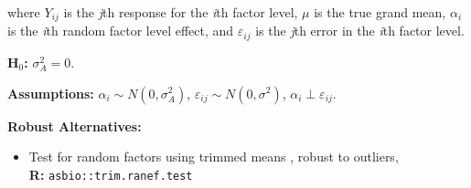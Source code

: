 \documentclass[12pt,english]{article}\usepackage[]{graphicx}\usepackage[table]{xcolor}
\begin{document}
\noindent where $Y_{ij}$ is the \textit{j}th response for the \textit{i}th factor level, $\mu$ is the true grand mean, $\alpha_i$ is the \textit{i}th random factor level effect, and $\varepsilon_{ij}$ is the \textit{j}th error in the \textit{i}th factor level. \\
\vspace{0.05in}

\noindent \textbf{H$_0$:} $\sigma^2_A = 0$.

\vspace{0.1in}
\noindent \textbf{Assumptions:} $\alpha_i \sim N(0, \sigma^2_A)$, \hspace{0.1in}  $\varepsilon_{ij} \sim N(0, \sigma^2)$, \hspace{0.1in} $\alpha_i \perp \varepsilon_{ij}$.
\vspace{0.1in}

\noindent \textbf{Robust Alternatives:}
\begin{small}
\begin{itemize}
\item Test for random factors using trimmed means \citep{wilcox2012}, robust to outliers,\\  \textbf{R:} \texttt{asbio::trim.ranef.test}
\end{itemize}
\end{small}
\end{document}
